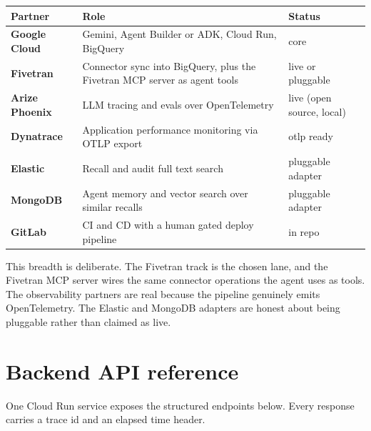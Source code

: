 \documentclass[11pt]{article}
\begin{document}
\begin{center}
\renewcommand{\arraystretch}{1.35}
\begin{tabularx}{\textwidth}{@{}>{\bfseries}l X l@{}}
\toprule
Partner & Role & Status \\
\midrule
Google Cloud & Gemini, Agent Builder or ADK, Cloud Run, BigQuery & core \\
Fivetran & Connector sync into BigQuery, plus the Fivetran MCP server as agent tools & live or pluggable \\
Arize Phoenix & LLM tracing and evals over OpenTelemetry & live (open source, local) \\
Dynatrace & Application performance monitoring via OTLP export & otlp ready \\
Elastic & Recall and audit full text search & pluggable adapter \\
MongoDB & Agent memory and vector search over similar recalls & pluggable adapter \\
GitLab & CI and CD with a human gated deploy pipeline & in repo \\
\bottomrule
\end{tabularx}
\end{center}

This breadth is deliberate. The Fivetran track is the chosen lane, and the Fivetran MCP server
wires the same connector operations the agent uses as tools. The observability partners are real
because the pipeline genuinely emits OpenTelemetry. The Elastic and MongoDB adapters are honest
about being pluggable rather than claimed as live.

\section{Backend API reference}

One Cloud Run service exposes the structured endpoints below. Every response carries a trace id and
an elapsed time header.
\end{document}
